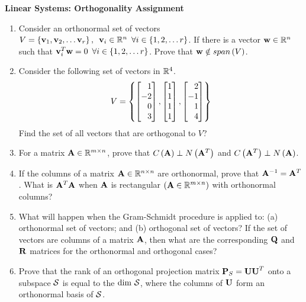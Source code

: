 \documentclass[9pt]{article}
\def\mf{\ensuremath\mathbf}
\def\mb{\ensuremath\mathbb}
\def\mc{\ensuremath\mathcal}
\def\lp{\ensuremath\left(}
\def\rp{\ensuremath\right)}
\def\bmx{\ensuremath\begin{bmatrix*}[r]}
\def\emx{\ensuremath\end{bmatrix*}}
\begin{document}
\begin{center}
\begin{Large}
\textbf{Linear Systems: Orthogonality Assignment}
\end{Large}
\end{center}
\vspace{0.2cm}

\begin{multicols}{2}
  \begin{enumerate}
    \item Consider an orthonormal set of vectors $V = \left\{ \mf{v}_1, \mf{v}_2, \ldots \mf{v}_r\right\},\,\,\, \mf{v}_i \in \mb{R}^n\,\,\,\forall i \in \left\{1, 2, \ldots r\right\}$. If there is a vector $\mf{w} \in \mb{R}^n$ such that $\mf{v}_i^T\mf{w} = 0\,\,\,\forall i \in \left\{1, 2, \ldots r\right\}$. Prove that $\mf{w} \notin span\left(V\right)$.
    
    \item Consider the following set of vectors in $\mb{R}^4$.
    \[ V = \left\{
    \bmx
    1\\-2\\0\\3
    \emx,
    \bmx
    1\\1\\1\\1
    \emx,
    \bmx
    2\\-1\\1\\4
    \emx
    \right\} \]
    Find the set of all vectors that are orthogonal to $V$?

    \item For a matrix $\mf{A} \in \mb{R}^{m \times n}$, prove that $C\lp\mf{A}\rp \perp N\lp\mf{A}^T\rp$ and $C\lp\mf{A}^T\rp \perp N\lp\mf{A}\rp$.

    \item If the columns of a matrix $\mf{A} \in \mb{R}^{n \times n}$ are orthonormal, prove that $\mf{A}^{-1} = \mf{A}^T$. What is $\mf{A}^T\mf{A}$ when $\mf{A}$ is rectangular $\left(\mf{A} \in \mb{R}^{m \times n}\right)$ with orthonormal columns?

    \item What will happen when the Gram-Schmidt procedure is applied to: (a) orthonormal set of vectors; and (b) orthogonal set of vectors? If the set of vectors are columns of a matrix $\mf{A}$, then what are the corresponding $\mf{Q}$ and $\mf{R}$ matrices for the orthonormal and orthogonal cases?

    \item Prove that the rank of an orthogonal projection matrix $\mf{P}_{S} = \mf{UU}^T$ onto a subspace $\mc{S}$ is equal to the $\text{dim } \mc{S}$, where the columns of $\mf{U}$ form an orthonormal basis of $\mc{S}$.


\end{enumerate}
\end{multicols}
\end{document}
